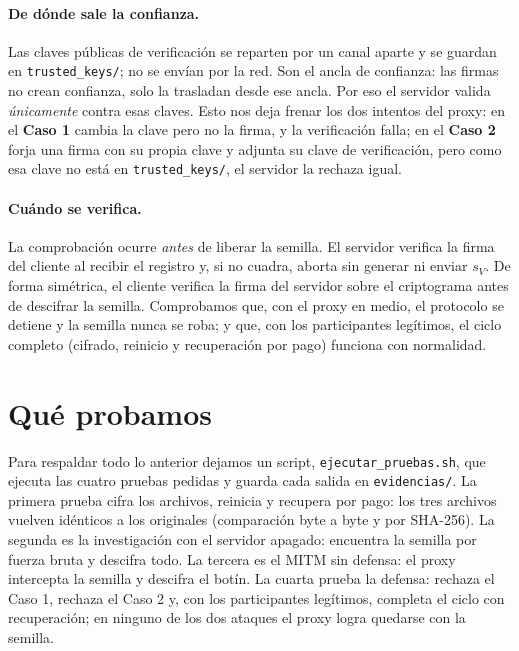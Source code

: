 \documentclass[11pt,a4paper]{article}
\begin{document}
\paragraph{De dónde sale la confianza.} Las claves públicas de verificación se
reparten por un canal aparte y se guardan en \texttt{trusted\_keys/}; no se envían
por la red. Son el ancla de confianza: las firmas no crean confianza, solo la
trasladan desde ese ancla. Por eso el servidor valida \emph{únicamente} contra esas
claves. Esto nos deja frenar los dos intentos del proxy: en el \textbf{Caso 1}
cambia la clave pero no la firma, y la verificación falla; en el \textbf{Caso 2}
forja una firma con su propia clave y adjunta su clave de verificación, pero como
esa clave no está en \texttt{trusted\_keys/}, el servidor la rechaza igual.

\paragraph{Cuándo se verifica.} La comprobación ocurre \emph{antes} de liberar la
semilla. El servidor verifica la firma del cliente al recibir el registro y, si no
cuadra, aborta sin generar ni enviar $s_V$. De forma simétrica, el cliente
verifica la firma del servidor sobre el criptograma antes de descifrar la semilla.
Comprobamos que, con el proxy en medio, el protocolo se detiene y la semilla nunca
se roba; y que, con los participantes legítimos, el ciclo completo (cifrado,
reinicio y recuperación por pago) funciona con normalidad.

\section{Qué probamos}

Para respaldar todo lo anterior dejamos un script, \texttt{ejecutar\_pruebas.sh},
que ejecuta las cuatro pruebas pedidas y guarda cada salida en \texttt{evidencias/}.
La primera prueba cifra los archivos, reinicia y recupera por pago: los tres
archivos vuelven idénticos a los originales (comparación byte a byte y por
SHA-256). La segunda es la investigación con el servidor apagado: encuentra la
semilla por fuerza bruta y descifra todo. La tercera es el MITM sin defensa: el
proxy intercepta la semilla y descifra el botín. La cuarta prueba la defensa:
rechaza el Caso 1, rechaza el Caso 2 y, con los participantes legítimos, completa
el ciclo con recuperación; en ninguno de los dos ataques el proxy logra quedarse
con la semilla.
\end{document}

